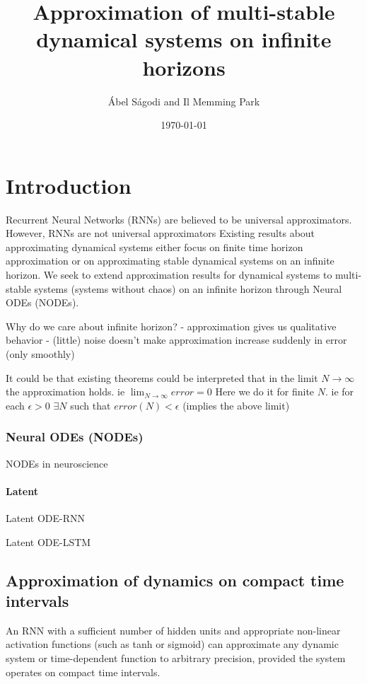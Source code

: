 \documentclass{article}
\title{Approximation of multi-stable dynamical systems on infinite horizons}
\author{\'Abel S\'agodi and Il Memming Park}
\date{\today}
\theoremstyle{definition}
\theoremstyle{remark}
\begin{document}
\maketitle

\section{Introduction}
Recurrent Neural Networks (RNNs) are believed to be universal approximators.
However, RNNs are not universal approximators 
Existing results about approximating dynamical systems either focus on finite time horizon approximation or on approximating stable dynamical systems on an infinite horizon.
We seek to extend approximation results for dynamical systems to multi-stable systems (systems without chaos) on an infinite horizon through Neural ODEs (NODEs).



Why do we care about infinite horizon?
- approximation gives us qualitative behavior
- (little) noise doesn't make approximation increase suddenly in error (only smoothly)


It could be that existing theorems could be interpreted that in the limit $N\rightarrow\infty$ the approximation holds.
ie $\lim_{N\rightarrow\infty} error = 0$
Here we do it for finite $N$.
ie for each $\epsilon>0$ $\exists N$ such that $error(N) < \epsilon$
(implies the above limit)



\subsubsection{Neural ODEs (NODEs)}
\citep{chen2018neural}

NODEs in neuroscience\citep{kim2021inferring}

\paragraph{Latent}
Latent ODE-RNN\citep{rubanova2019latent}

Latent ODE-LSTM \citep{coelho2024enhancing}

\subsection{Approximation of dynamics on compact time intervals}
An RNN with a sufficient number of hidden units and appropriate non-linear activation functions (such as tanh or sigmoid) can approximate any dynamic system or time-dependent function to arbitrary precision, provided the system operates on compact time intervals.
\end{document}
